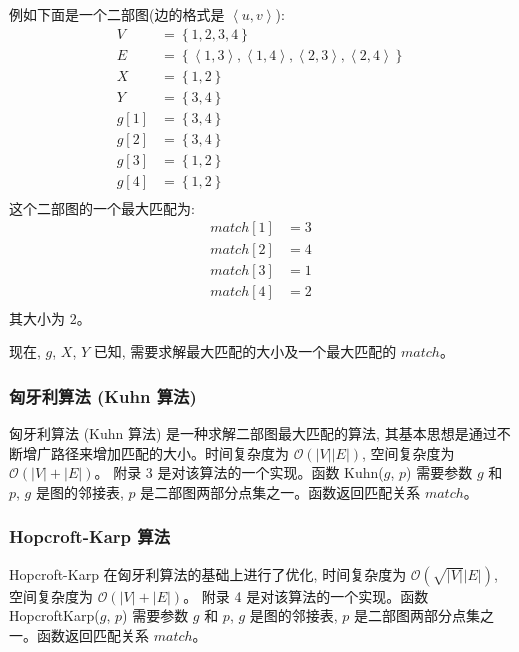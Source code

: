 例如下面是一个二部图(边的格式是 $\left<u, v\right>$): 
$$
\begin{aligned}
	V &= \left\{1, 2, 3, 4\right\} \\
	E &= \left\{\left<1, 3\right>, \left<1, 4\right>, \left<2, 3\right>, \left<2, 4\right>\right\} \\
	X &= \left\{1, 2\right\} \\
	Y &= \left\{3, 4\right\} \\
	g[1] &= \left\{3, 4\right\} \\
	g[2] &= \left\{3, 4\right\} \\
	g[3] &= \left\{1, 2\right\} \\
	g[4] &= \left\{1, 2\right\} \\
\end{aligned}
$$
这个二部图的一个最大匹配为:
$$
\begin{aligned}
	match[1] &= 3 \\
	match[2] &= 4 \\
	match[3] &= 1 \\
	match[4] &= 2 \\
\end{aligned}
$$
其大小为 $2$。

现在, $g$, $X$, $Y$ 已知, 需要求解最大匹配的大小及一个最大匹配的 $match$。
\subsubsection{匈牙利算法 (Kuhn 算法)}
匈牙利算法 (Kuhn 算法) 是一种求解二部图最大匹配的算法, 其基本思想是通过不断增广路径来增加匹配的大小。时间复杂度为 $\mathcal{O}(\left|V\right|\left|E\right|)$, 空间复杂度为 $\mathcal{O}(\left|V\right| + \left|E\right|)$。
附录 3 是对该算法的一个实现。函数 Kuhn($g$, $p$) 需要参数 $g$ 和 $p$, $g$ 是图的邻接表, $p$ 是二部图两部分点集之一。函数返回匹配关系 $match$。
\subsubsection{Hopcroft-Karp 算法}
Hopcroft-Karp 在匈牙利算法的基础上进行了优化, 时间复杂度为 $\mathcal{O}(\sqrt{\left|V\right|}\left|E\right|)$, 空间复杂度为 $\mathcal{O}(\left|V\right| + \left|E\right|)$。
附录 4 是对该算法的一个实现。函数 HopcroftKarp($g$, $p$) 需要参数 $g$ 和 $p$, $g$ 是图的邻接表, $p$ 是二部图两部分点集之一。函数返回匹配关系 $match$。

